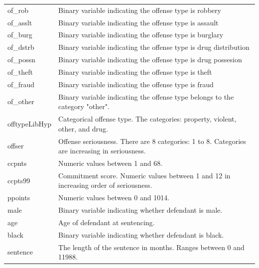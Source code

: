 \documentclass[11pt]{article}
\theoremstyle{ModifiedStyle}
\begin{document}
\begin{table}[H]
\begin{tabular}{|ll|}
        of\_rob           & Binary variable indicating the offense type is robbery                      \\
        of\_asslt         & Binary variable indicating the offense type is assault                      \\
        of\_burg          & Binary variable indicating the offense type is burglary                     \\
        of\_dstrb         & Binary variable indicating the offense type is drug distribution            \\
        of\_possn         & Binary variable indicating the offense type is drug possesion               \\
        of\_theft         & Binary variable indicating the offense type is theft                        \\
        of\_fraud         & Binary variable indicating the offense type is fraud                        \\
        of\_other       & Binary variable indicating the offense type belongs to the category "other".                                  \\
        offtypeLibHyp   & Categorical offense type. The categories: property, violent, other, and drug.                                 \\
        offser          & Offense seriousness. There are 8 categories: 1 to 8. Categories are increasing in seriousness.                \\
        ccpnts            & Numeric values between 1 and 68.                                            \\
        ccpts99         & Commitment score. Numeric values between 1 and 12 in increasing order of seriousness.                         \\
        ppoints           & Numeric values between 0 and 1014.                                          \\
        male              & Binary variable indicating whether defendant is male.                       \\
        age               & Age of defendant at sentencing.                                             \\
        black             & Binary variable indicating whether defendant is black.                      \\
        sentence          & The length of the sentence in months. Ranges between 0 and 11988.           \\ \hline
        \end{tabular}
      \end{table}
\end{document}

